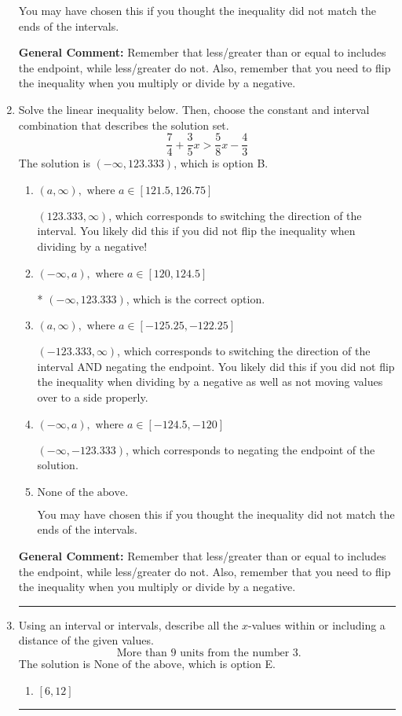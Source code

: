\documentclass{extbook}[14pt]
\newcommand{\litem}[1]{\item #1

\rule{\textwidth}{0.4pt}}
\begin{document}
\begin{enumerate}
{\begin{enumerate}[label=\Alph*.]
You may have chosen this if you thought the inequality did not match the ends of the intervals.
\end{enumerate}

\textbf{General Comment:} Remember that less/greater than or equal to includes the endpoint, while less/greater do not. Also, remember that you need to flip the inequality when you multiply or divide by a negative.
}
\litem{
Solve the linear inequality below. Then, choose the constant and interval combination that describes the solution set.
\[ \frac{7}{4} + \frac{3}{5} x > \frac{5}{8} x - \frac{4}{3} \]The solution is \( (-\infty, 123.333) \), which is option B.\begin{enumerate}[label=\Alph*.]
\item \( (a, \infty), \text{ where } a \in [121.5, 126.75] \)

 $(123.333, \infty)$, which corresponds to switching the direction of the interval. You likely did this if you did not flip the inequality when dividing by a negative!
\item \( (-\infty, a), \text{ where } a \in [120, 124.5] \)

* $(-\infty, 123.333)$, which is the correct option.
\item \( (a, \infty), \text{ where } a \in [-125.25, -122.25] \)

 $(-123.333, \infty)$, which corresponds to switching the direction of the interval AND negating the endpoint. You likely did this if you did not flip the inequality when dividing by a negative as well as not moving values over to a side properly.
\item \( (-\infty, a), \text{ where } a \in [-124.5, -120] \)

 $(-\infty, -123.333)$, which corresponds to negating the endpoint of the solution.
\item \( \text{None of the above}. \)

You may have chosen this if you thought the inequality did not match the ends of the intervals.
\end{enumerate}

\textbf{General Comment:} Remember that less/greater than or equal to includes the endpoint, while less/greater do not. Also, remember that you need to flip the inequality when you multiply or divide by a negative.
}
\litem{
Using an interval or intervals, describe all the $x$-values within or including a distance of the given values.
\[ \text{ More than } 9 \text{ units from the number } 3. \]The solution is \( \text{None of the above} \), which is option E.\begin{enumerate}[label=\Alph*.]
\item \( [6, 12] \)


\end{enumerate}}
\end{enumerate}
\end{document}
